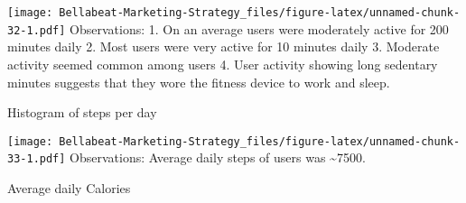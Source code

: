 \documentclass[
]{article}
\newenvironment{Shaded}{\begin{snugshade}}{\end{snugshade}}
\newcommand{\AttributeTok}[1]{\textcolor[rgb]{0.77,0.63,0.00}{#1}}
\newcommand{\DecValTok}[1]{\textcolor[rgb]{0.00,0.00,0.81}{#1}}
\newcommand{\FunctionTok}[1]{\textcolor[rgb]{0.00,0.00,0.00}{#1}}
\newcommand{\NormalTok}[1]{#1}
\newcommand{\SpecialCharTok}[1]{\textcolor[rgb]{0.00,0.00,0.00}{#1}}
\newcommand{\StringTok}[1]{\textcolor[rgb]{0.31,0.60,0.02}{#1}}
\begin{document}
\texttt{[image: Bellabeat-Marketing-Strategy\_files/figure-latex/unnamed-chunk-32-1.pdf]}
Observations: 1. On an average users were moderately active for 200
minutes daily 2. Most users were very active for 10 minutes daily 3.
Moderate activity seemed common among users 4. User activity showing
long sedentary minutes suggests that they wore the fitness device to
work and sleep.

Histogram of steps per day

\begin{Shaded}
\end{Shaded}

\texttt{[image: Bellabeat-Marketing-Strategy\_files/figure-latex/unnamed-chunk-33-1.pdf]}
Observations: Average daily steps of users was \textasciitilde7500.

Average daily Calories

\begin{Shaded}
\end{Shaded}
\end{document}
